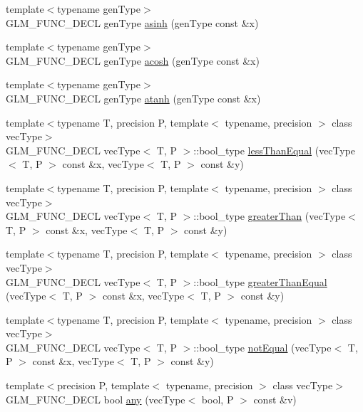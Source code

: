 \begin{CompactItemize}
\item 
{\footnotesize template$<$typename genType$>$ }\\GLM\_\-FUNC\_\-DECL genType \hyperlink{group__core__func__trigonometric_gaedecffe9a7c10e5930c4ec938a0ca2e}{asinh} (genType const \&x)
\item 
{\footnotesize template$<$typename genType$>$ }\\GLM\_\-FUNC\_\-DECL genType \hyperlink{group__core__func__trigonometric_g7d91deddd26925a390f08448a1b9ab1a}{acosh} (genType const \&x)
\item 
{\footnotesize template$<$typename genType$>$ }\\GLM\_\-FUNC\_\-DECL genType \hyperlink{group__core__func__trigonometric_g5207916954ad98477bf488a9a188f045}{atanh} (genType const \&x)
\item 
{\footnotesize template$<$typename T, precision P, template$<$ typename, precision $>$ class vecType$>$ }\\GLM\_\-FUNC\_\-DECL vecType$<$ T, P $>$::bool\_\-type \hyperlink{group__core__func__vector__relational_g9792ee46fa6f48a7f750984128c24d03}{lessThanEqual} (vecType$<$ T, P $>$ const \&x, vecType$<$ T, P $>$ const \&y)
\item 
{\footnotesize template$<$typename T, precision P, template$<$ typename, precision $>$ class vecType$>$ }\\GLM\_\-FUNC\_\-DECL vecType$<$ T, P $>$::bool\_\-type \hyperlink{group__core__func__vector__relational_g752f4c03f55a280172de9ceff7a02b51}{greaterThan} (vecType$<$ T, P $>$ const \&x, vecType$<$ T, P $>$ const \&y)
\item 
{\footnotesize template$<$typename T, precision P, template$<$ typename, precision $>$ class vecType$>$ }\\GLM\_\-FUNC\_\-DECL vecType$<$ T, P $>$::bool\_\-type \hyperlink{group__core__func__vector__relational_ga384b9c124d40d56bf5bd02ea9b04926}{greaterThanEqual} (vecType$<$ T, P $>$ const \&x, vecType$<$ T, P $>$ const \&y)
\item 
{\footnotesize template$<$typename T, precision P, template$<$ typename, precision $>$ class vecType$>$ }\\GLM\_\-FUNC\_\-DECL vecType$<$ T, P $>$::bool\_\-type \hyperlink{group__core__func__vector__relational_g520b77f15b84fffa9131cfa39db6c766}{notEqual} (vecType$<$ T, P $>$ const \&x, vecType$<$ T, P $>$ const \&y)
\item 
{\footnotesize template$<$precision P, template$<$ typename, precision $>$ class vecType$>$ }\\GLM\_\-FUNC\_\-DECL bool \hyperlink{group__core__func__vector__relational_ge1073be2b9f4c5ffa77eec25400e8121}{any} (vecType$<$ bool, P $>$ const \&v)

\end{CompactItemize}
